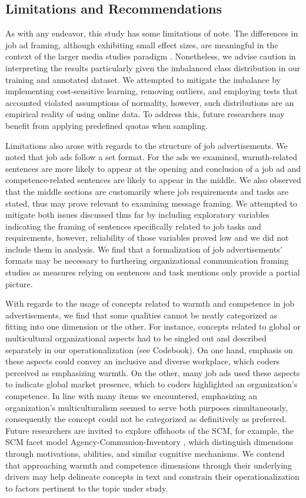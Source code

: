 \documentclass[jou]{apa7}
\begin{document}
\subsection{Limitations and Recommendations}
\label{limitations_and_recommendations}
As with any endeavor, this study has some limitations of note. The differences in job ad framing, although exhibiting small effect sizes, are meaningful in the context of the larger media studies paradigm \parencite{Perloff2013}. Nonetheless, we advise caution in interpreting the results particularly given the imbalanced class distribution in our training and annotated dataset. We attempted to mitigate the imbalance by implementing cost-sensitive learning, removing outliers, and employing tests that accounted violated assumptions of normality, however, such distributions are an empirical reality of using online data. To address this, future researchers may benefit from applying predefined quotas when sampling.

Limitations also arose with regards to the structure of job advertisements. We noted that job ads follow a set format. For the ads we examined, warmth-related sentences are more likely to appear at the opening and conclusion of a job ad and competence-related sentences are likely to appear in the middle. We also observed that the middle sections are customarily where job requirements and tasks are stated, thus may prove relevant to examining message framing. We attempted to mitigate both issues discussed thus far by including exploratory variables indicating the framing of sentences specifically related to job tasks and requirements, however, reliability of those variables proved low and we did not include them in analysis. We find that a formalization of job advertisements’ formats may be necessary to furthering organizational communication framing studies as measures relying on sentences and task mentions only provide a partial picture.

With regards to the usage of concepts related to warmth and competence in job advertisements, we find that some qualities cannot be neatly categorized as fitting into one dimension or the other. For instance, concepts related to global or multicultural organizational aspects had to be singled out and described separately in our operationalization (see Codebook). On one hand, emphasis on these aspects could convey an inclusive and diverse workplace, which coders perceived as emphasizing warmth. On the other, many job ads used these aspects to indicate global market presence, which to coders highlighted an organization’s competence. In line with many items we encountered, emphasizing an organization’s multiculturalism seemed to serve both purposes simultaneously, consequently the concept could not be categorized as definitively as preferred. Future researchers are invited to explore offshoots of the SCM, for example, the SCM facet model Agency-Communion-Inventory \parencite[AC-IN; ][]{abeleFacetsFundamentalContent2016}, which distinguish dimensions through motivations, abilities, and similar cognitive mechanisms. We contend that approaching warmth and competence dimensions through their underlying drivers may help delineate concepts in text and constrain their operationalization to factors pertinent to the topic under study.
\end{document}

